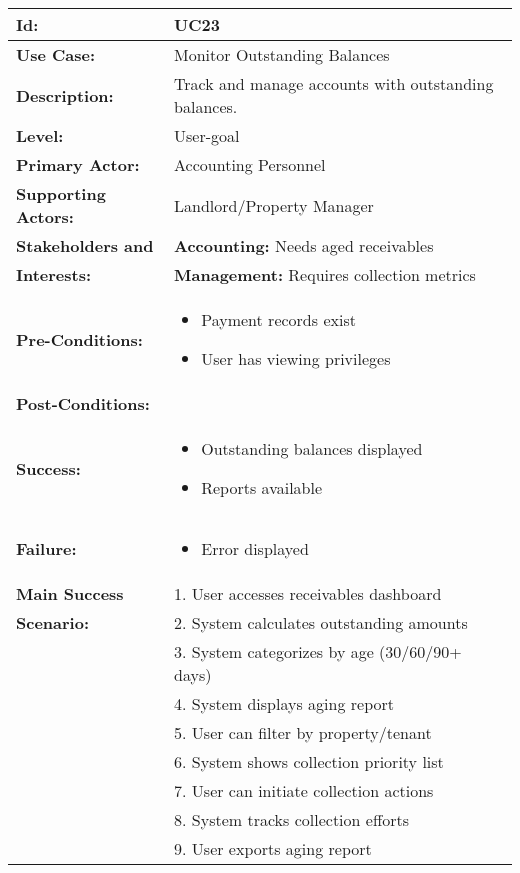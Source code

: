 \documentclass[12pt]{article}
\begin{document}
\begin{longtable}{|p{3cm}|p{11cm}|}
\hline
\textbf{Id:} & UC23 \\
\hline
\textbf{Use Case:} & Monitor Outstanding Balances \\
\hline
\textbf{Description:} & Track and manage accounts with outstanding balances. \\
\hline
\textbf{Level:} & User-goal \\
\hline
\textbf{Primary Actor:} & Accounting Personnel \\
\hline
\textbf{Supporting Actors:} & Landlord/Property Manager \\
\hline
\textbf{Stakeholders and} & \textbf{Accounting:} Needs aged receivables \\
\textbf{Interests:} & \textbf{Management:} Requires collection metrics \\
\hline
\textbf{Pre-Conditions:} & 
\begin{itemize}
    \item Payment records exist
    \item User has viewing privileges
\end{itemize} \\
\hline
\textbf{Post-Conditions:} & \\
\textbf{Success:} & 
\begin{itemize}
    \item Outstanding balances displayed
    \item Reports available
\end{itemize} \\
\textbf{Failure:} & 
\begin{itemize}
    \item Error displayed
\end{itemize} \\
\hline
\textbf{Main Success} & 1. User accesses receivables dashboard \\
\textbf{Scenario:} & 2. System calculates outstanding amounts \\
& 3. System categorizes by age (30/60/90+ days) \\
& 4. System displays aging report \\
& 5. User can filter by property/tenant \\
& 6. System shows collection priority list \\
& 7. User can initiate collection actions \\
& 8. System tracks collection efforts \\
& 9. User exports aging report \\

\end{longtable}
\end{document}
